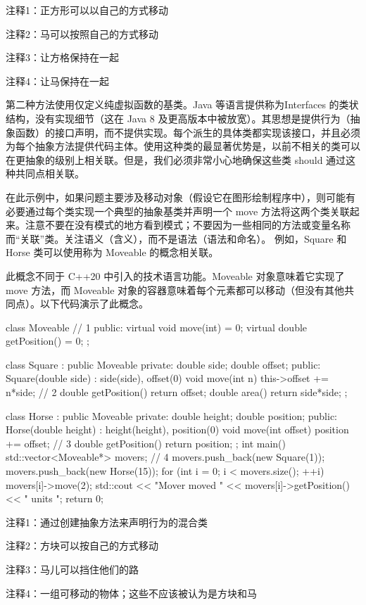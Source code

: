 {\footnotesize
注释1：正方形可以以自己的方式移动

注释2：马可以按照自己的方式移动

注释3：让方格保持在一起

注释4：让马保持在一起
}

第二种方法使用仅定义纯虚拟函数的基类。Java 等语言提供称为Interfaces 的类状结构，没有实现细节（这在 Java 8 及更高版本中被放宽）。其思想是提供行为（抽象函数）的接口声明，而不提供实现。每个派生的具体类都实现该接口，并且必须为每个抽象方法提供代码主体。使用这种类的最显著优势是，以前不相关的类可以在更抽象的级别上相关联。但是，我们必须非常小心地确保这些类 should 通过这种共同点相关联。

在此示例中，如果问题主要涉及移动对象（假设它在图形绘制程序中），则可能有必要通过每个类实现一个典型的抽象基类并声明一个 move 方法将这两个类关联起来。注意不要在没有模式的地方看到模式；不要因为一些相同的方法或变量名称而“关联”类。关注语义（含义），而不是语法（语法和命名）。
例如，Square 和 Horse 类可以使用称为 Moveable 的概念相关联。

此概念不同于 C++20 中引入的技术语言功能。Moveable 对象意味着它实现了 move 方法，而 Moveable 对象的容器意味着每个元素都可以移动（但没有其他共同点）。以下代码演示了此概念。


\begin{cpp}
class Moveable { // 1
public:
  virtual void move(int) = 0;
  virtual double getPosition() = 0;
};

class Square : public Moveable {
private:
  double side;
  double offset;
public:
  Square(double side) : side(side), offset(0) {}
  void move(int n) { this->offset += n*side; } // 2
  double getPosition() { return offset; }
  double area() { return side*side; }
};

class Horse : public Moveable {
private:
  double height;
  double position;
public:
  Horse(double height) : height(height), position(0) {}
  void move(int offset) { position += offset; } // 3
  double getPosition() { return position; }
};
int main() {
  std::vector<Moveable*> movers; // 4
  movers.push_back(new Square(1));
  movers.push_back(new Horse(15));
  for (int i = 0; i < movers.size(); ++i) {
    movers[i]->move(2);
    std::cout << "Mover moved " << movers[i]->getPosition() << " units \n";
  }
  return 0;
}
\end{cpp}

{\footnotesize
注释1：通过创建抽象方法来声明行为的混合类

注释2：方块可以按自己的方式移动

注释3：马儿可以挡住他们的路

注释4：一组可移动的物体；这些不应该被认为是方块和马
}

